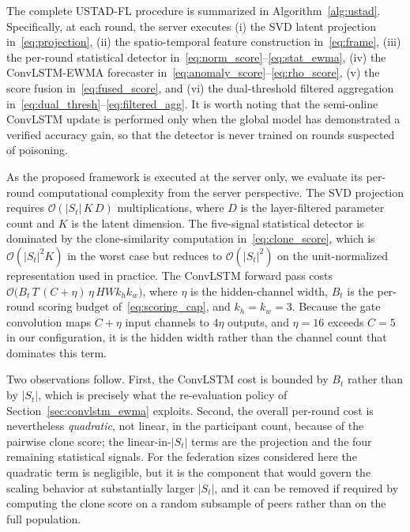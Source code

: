 \documentclass[journal]{IEEEtran}
\begin{document}
The complete USTAD-FL procedure is summarized in Algorithm~\ref{alg:ustad}. Specifically, at each round, the server executes (i) the SVD latent projection in~\eqref{eq:projection}, (ii) the spatio-temporal feature construction in~\eqref{eq:frame}, (iii) the per-round statistical detector in~\eqref{eq:norm_score}--\eqref{eq:stat_ewma}, (iv) the ConvLSTM-EWMA forecaster in~\eqref{eq:anomaly_score}--\eqref{eq:rho_score}, (v) the score fusion in~\eqref{eq:fused_score}, and (vi) the dual-threshold filtered aggregation in~\eqref{eq:dual_thresh}--\eqref{eq:filtered_agg}. It is worth noting that the semi-online ConvLSTM update is performed only when the global model has demonstrated a verified accuracy gain, so that the detector is never trained on rounds suspected of poisoning.

As the proposed framework is executed at the server only, we evaluate its per-round computational complexity from the server perspective. The SVD projection requires $\mathcal{O}(|S_t|\,K\,D)$ multiplications, where $D$ is the layer-filtered parameter count and $K$ is the latent dimension. The five-signal statistical detector is dominated by the clone-similarity computation in~\eqref{eq:clone_score}, which is $\mathcal{O}(|S_t|^2 K)$ in the worst case but reduces to $\mathcal{O}(|S_t|^2)$ on the unit-normalized representation used in practice. The ConvLSTM forward pass costs $\mathcal{O}\bigl(B_t\,T\,(C + \eta)\,\eta\, H W k_h k_w\bigr)$, where $\eta$ is the hidden-channel width, $B_t$ is the per-round scoring budget of~\eqref{eq:scoring_cap}, and $k_h\!=\!k_w\!=\!3$. Because the gate convolution maps $C + \eta$ input channels to $4\eta$ outputs, and $\eta = 16$ exceeds $C = 5$ in our configuration, it is the hidden width rather than the channel count that dominates this term.

Two observations follow. First, the ConvLSTM cost is bounded by $B_t$ rather than by $|S_t|$, which is precisely what the re-evaluation policy of Section~\ref{sec:convlstm_ewma} exploits. Second, the overall per-round cost is nevertheless \emph{quadratic}, not linear, in the participant count, because of the pairwise clone score; the linear-in-$|S_t|$ terms are the projection and the four remaining statistical signals. For the federation sizes considered here the quadratic term is negligible, but it is the component that would govern the scaling behavior at substantially larger $|S_t|$, and it can be removed if required by computing the clone score on a random subsample of peers rather than on the full population.
\end{document}
